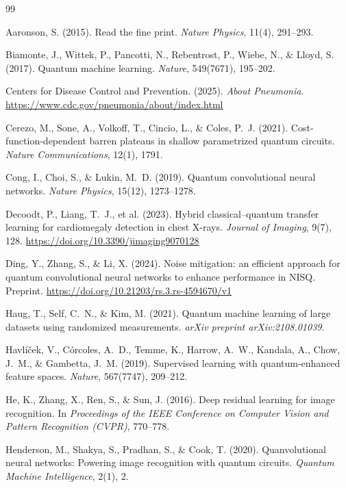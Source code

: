 \documentclass[11pt,a4paper]{article}
\begin{document}
\begin{thebibliography}{99}

Aaronson, S. (2015). Read the fine print. \emph{Nature Physics}, 11(4),
291--293.

Biamonte, J., Wittek, P., Pancotti, N., Rebentrost, P., Wiebe, N., \& Lloyd,
S. (2017). Quantum machine learning. \emph{Nature}, 549(7671), 195--202.

Centers for Disease Control and Prevention. (2025). \emph{About Pneumonia}.
\url{https://www.cdc.gov/pneumonia/about/index.html}

Cerezo, M., Sone, A., Volkoff, T., Cincio, L., \& Coles, P.~J. (2021).
Cost-function-dependent barren plateaus in shallow parametrized quantum
circuits. \emph{Nature Communications}, 12(1), 1791.

Cong, I., Choi, S., \& Lukin, M.~D. (2019). Quantum convolutional neural
networks. \emph{Nature Physics}, 15(12), 1273--1278.

Decoodt, P., Liang, T.~J., et al. (2023). Hybrid classical--quantum transfer
learning for cardiomegaly detection in chest X-rays. \emph{Journal of
Imaging}, 9(7), 128.
\url{https://doi.org/10.3390/jimaging9070128}

Ding, Y., Zhang, S., \& Li, X. (2024). Noise mitigation: an efficient approach
for quantum convolutional neural networks to enhance performance in NISQ.
Preprint. \url{https://doi.org/10.21203/rs.3.rs-4594670/v1}

Haug, T., Self, C.~N., \& Kim, M. (2021). Quantum machine learning of
large datasets using randomized measurements. \emph{arXiv preprint
arXiv:2108.01039}.

Havl\'i\v{c}ek, V., C\'orcoles, A.~D., Temme, K., Harrow, A.~W., Kandala,
A., Chow, J.~M., \& Gambetta, J.~M. (2019). Supervised learning with
quantum-enhanced feature spaces. \emph{Nature}, 567(7747), 209--212.

He, K., Zhang, X., Ren, S., \& Sun, J. (2016). Deep residual learning for
image recognition. In \emph{Proceedings of the IEEE Conference on Computer
Vision and Pattern Recognition (CVPR)}, 770--778.

Henderson, M., Shakya, S., Pradhan, S., \& Cook, T. (2020). Quanvolutional
neural networks: Powering image recognition with quantum circuits.
\emph{Quantum Machine Intelligence}, 2(1), 2.


\end{thebibliography}
\end{document}
